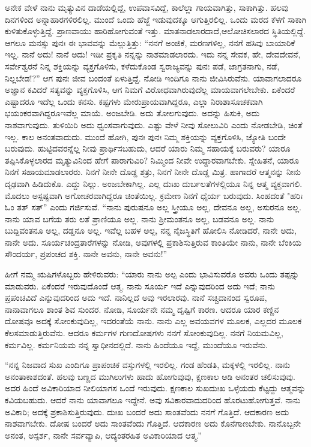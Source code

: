 ಅನೇಕ ವೇಳೆ ನಾನು ಮೃತ್ಯುವಿನ ದಾಡೆಯಲ್ಲಿದ್ದೆ, ಉಪವಾಸವಿದ್ದೆ, ಕಾಲೆಲ್ಲಾ ಗಾಯವಾಗಿತ್ತು, ಸಾಕಾಗಿತ್ತು. ಹಲವು ದಿನಗಳಿಂದ ಅನ್ನಾಹಾರಗಳಿರಲಿಲ್ಲ. ಮುಂದೆ ಒಂದು ಹೆಜ್ಜೆ ಇಡುವುದಕ್ಕೂ ಆಗುತ್ತಿರಲಿಲ್ಲ. ಒಂದು ಮರದ ಕೆಳಗೆ ಸಾಕಾಗಿ ಕುಳಿತುಕೊಳ್ಳುತ್ತಿದ್ದೆ. ಪ್ರಾಣವಾಯು ಹಾರಿಹೋಗುವಂತೆ ಇತ್ತು. ಮಾತನಾಡಲಾರದಾದೆ,\break ಆಲೋಚಿಸಲಾರದ ಸ್ಥಿತಿಯಲ್ಲಿದ್ದೆ. ಆಗಲೂ ಮನಸ್ಸು ಪುನಃ ಈ ಭಾವವನ್ನು ಮೆಲ್ಲುತ್ತಿತ್ತು: “ನನಗೆ ಅಂಜಿಕೆ, ಮರಣಗಳಿಲ್ಲ, ನನಗೆ ಹಸಿವು ಬಾಯಾರಿಕೆ ಇಲ್ಲ. ನಾನೆ ಅದು! ನಾನೆ ಅದು! ಇಡೀ ಪ್ರಕೃತಿ ನನ್ನನ್ನು ನಾಶಮಾಡಲಾರದು. ಇದು ನನ್ನ ಸೇವಕ, ಹೇ, ದೇವದೇವನೆ, ಸರ್ವೇಶ್ವರನೆ ನಿನ್ನ ಶಕ್ತಿಯನ್ನು ವ್ಯಕ್ತಗೊಳಿಸು, ಕಳೆದುಕೊಂಡ ಸ್ವರಾಜ್ಯವನ್ನು ಪುನಃ ಪಡೆ, ಜಾಗ್ರತನಾಗು, ನಡೆ, ನಿಲ್ಲಬೇಡ!?” ಆಗ ಪುನಃ ಜೀವ ಬಂದಂತೆ ಏಳುತ್ತಿದ್ದೆ. ನೋಡಿ ಇಂದಿಗೂ ನಾನು ಜೀವಿಸಿರುವೆನು. ಯಾವಾಗಲಾದರೂ ಅಜ್ಞಾನ ಕವಿದರೆ ಸತ್ಯವನ್ನು ವ್ಯಕ್ತಗೊಳಿಸಿ, ಆಗ ನಿಮಗೆ ವಿರೋಧವಾಗಿರುವುದೆಲ್ಲ ಮಾಯವಾಗಲೇಬೇಕು. ಏಕೆಂದರೆ ಎಷ್ಟಾದರೂ ಇದೆಲ್ಲ ಒಂದು ಕನಸು. ಕಷ್ಟಗಳು ಮೇರುಪ್ರಾಯವಾಗಿದ್ದರೂ, ಎಲ್ಲಾ ನಿರಾಶಾಸೂಚಕವಾಗಿ ಭಯಂಕರವಾಗಿದ್ದರೂ\break ಇವೆಲ್ಲ ಮಾಯೆ. ಅಂಜಬೇಡಿ. ಅದು ತೋಲಗುವುದು. ಅದನ್ನು ಹಿಸುಕಿ, ಅದು ನಾಶವಾಗುವುದು. ತುಳಿಯಿರಿ ಅದು ಧ್ವಂಸವಾಗುವುದು. ಎಷ್ಟು ವೇಳೆ ನೀವು ಸೋಲುವಿರಿ ಎಂದು ನೋಡಬೇಡಿ, ಚಿಂತೆ ಇಲ್ಲ. ಕಾಲ ಅನಂತವಾದುದು. ಮುಂದೆ ಹೋಗಿ, ಪುನಃ ಪುನಃ ನಿಮ್ಮ ಶಕ್ತಿಯನ್ನು ವ್ಯಕ್ತಗೊಳಿಸಿ, ಜ್ಯೋತಿ ಬಂದೇ ಬರುವುದು. ಹುಟ್ಟಿದವರನ್ನೆಲ್ಲ ನೀವು ಪ್ರಾರ್ಥಿಸಬಹುದು, ಆದರೆ ಯಾರು ನಿಮ್ಮ ಸಹಾಯಕ್ಕೆ ಬರುವರು? ಯಾರೂ ತಪ್ಪಿಸಿಕೊಳ್ಳಲಾರದ ಮೃತ್ಯುವಿನಿಂದ ಹೇಗೆ ಪಾರಾಗುವಿರಿ? ನಿಮ್ಮಿಂದ ನೀವೇ ಉದ್ದಾರವಾಗಬೇಕು. ಸ್ನೇಹಿತನೆ, ಯಾರೂ ನಿನಗೆ ಸಹಾಯಮಾಡಲಾರರು. ನಿನಗೆ ನೀನೇ ದೊಡ್ಡ ಶತ್ರು, ನಿನಗೆ ನೀನೇ ದೊಡ್ಡ ಮಿತ್ರ. ಹಾಗಾದರೆ ಆತ್ಮನನ್ನು ನೀನು ದೃಢವಾಗಿ ಹಿಡಿದುಕೊ. ಎದ್ದು ನಿಲ್ಲು. ಅಂಜಬೇಕಾಗಿಲ್ಲ. ಎಲ್ಲ ದುಃಖ ದುರ್ಬಲತೆಗಳಲ್ಲಿಯೂ ನಿನ್ನ ಆತ್ಮ ವ್ಯಕ್ತವಾಗಲಿ. ಮೊದಲು ಅಸ್ಪಷ್ಟವಾಗಿ ಅಗೋಚರವಾಗಿದ್ದರೂ ಚಿಂತೆಯಿಲ್ಲ. ಕ್ರಮೇಣ ನಿನಗೆ ಧೈರ್ಯ ಬರುವುದು. ಸಿಂಹದಂತೆ "ಹರಿಃ ಓಂ ತತ್ ಸತ್'' ಎಂದು ಗರ್ಜಿಸುವೆ. “ನಾನು ಪುರುಷನೂ ಅಲ್ಲ ಸ್ತ್ರೀಯೂ ಅಲ್ಲ, ದೇವನೂ ಅಲ್ಲ, ಅಸುರನೂ ಅಲ್ಲ. ನಾನು ಯಾವ ಬಗೆಯ ತರು ಲತೆ ಪ್ರಾಣಿಯೂ ಅಲ್ಲ. ನಾನು ಶ‍್ರೀಮಂತನೂ ಅಲ್ಲ, ಬಡವನೂ ಅಲ್ಲ. ನಾನು ಬುದ್ದಿವಂತನೂ ಅಲ್ಲ, ದಡ್ಡನೂ ಅಲ್ಲ. ಇವೆಲ್ಲ ಬಹಳ ಅಲ್ಪ, ನನ್ನ ನೈಜಸ್ಥಿತಿಗೆ ಹೋಲಿಸಿ ನೋಡಿದರೆ, ನಾನೇ ಅದು, ನಾನೇ ಅದು. ಸೂರ್ಯಚಂದ್ರತಾರೆಗಳನ್ನು ನೋಡಿ, ಅವುಗಳಲ್ಲಿ ಪ್ರಕಾಶಿಸುತ್ತಿರುವ ಕಾಂತಿಯೇ ನಾನು, ನಾನೇ ಬೆಂಕಿಯ ಸೌಂದರ್ಯ, ಪ್ರಪಂಚದ ಶಕ್ತಿ. ನಾನೇ ಅವನು, ನಾನೇ ಅವನು!”

ಹೀಗೆ ನಮ್ಮ ಋಷಿಗಳೊಬ್ಬರು ಹೇಳಿರುವರು: “ಯಾರು ನಾನು ಅಲ್ಪ ಎಂದು ಭಾವಿಸುವರೊ ಅವರು ಒಂದು ತಪ್ಪನ್ನು ಮಾಡುವರು. ಏಕೆಂದರೆ ಇರುವುದೊಂದೆ ಆತ್ಮ. ನಾನು ಸೂರ್ಯ ಇದೆ ಎನ್ನುವುದರಿಂದ ಅದು ಇದೆ; ನಾನು ಪ್ರಪಂಚವಿದೆ ಎನ್ನುವುದರಿಂದ ಅದು ಇದೆ. ನಾನಿಲ್ಲದೆ ಅವು ಇರಲಾರವು. ನಾನೆ ಸಚ್ಚಿದಾನಂದ ಸ್ವರೂಪ, ನಾನಾವಾಗಲೂ ಶಾಂತ ಶಿವ ಸುಂದರ. ನೋಡಿ, ಸೂರ್ಯನೇ ನಮ್ಮ ದೃಷ್ಟಿಗೆ ಕಾರಣ. ಆದರೂ ಯಾರ ಕಣ್ಣಿನ ದೋಷವೂ ಅದಕ್ಕೆ ಸೋಂಕುವುದಿಲ್ಲ, ಇದರಂತೆಯೆ ನಾನು. ನಾನು ಎಲ್ಲ ಅವಯವಗಳ ಮೂಲಕ, ಎಲ್ಲದರ ಮೂಲಕ ಕೆಲಸಮಾಡುತ್ತಿರುವೆನು. ಆದರೂ ಕರ್ಮಗಳ ಗುಣದೋಷಗಳು ನನಗೆ ಸೋಂಕುವುದಿಲ್ಲ. ನನಗೆ ನಿಯಮವಿಲ್ಲ, ಕರ್ಮವಿಲ್ಲ. ಕರ್ಮನಿಯಮ ನನ್ನ ಸ್ವಾಧೀನದಲ್ಲಿದೆ. ನಾನು ಹಿಂದೆಯೂ ಇದ್ದೆ, ಮುಂದೆಯೂ ಇರುವೆನು.

“ನನ್ನ ನಿಜವಾದ ಸುಖ ಎಂದಿಗೂ ಪ್ರಾಪಂಚಿಕ ವಸ್ತುಗಳಲ್ಲಿ ಇರಲಿಲ್ಲ. ಗಂಡ ಹೆಂಡತಿ, ಮಕ್ಕಳಲ್ಲಿ ಇರಲಿಲ್ಲ. ನಾನು ಅನಂತಾಕಾಶದಂತೆ. ಹಲವು ಬಣ್ಣದ ಮುಗಿಲುಗಳು ಹಾದು ಹೋಗುವುವು, ಕ್ಷಣಕಾಲ ಆಡಿ ಅನಂತರ ಚಲಿಸುವುವು. ಅದರ ಹಿಂದೆ ಅವಿಕಾರಿಯಾದ ನೀಲಿಯಾಗಸ ಒಂದೆ ಇರುವುದು. ಕ್ಷಣಕಾಲ ಸುಖದುಃಖ ಒಳ್ಳೆಯದು ಕೆಟ್ಟದ್ದು ಆತ್ಮವನ್ನು ಕವಿಯಬಹುದು. ಆದರೆ ನಾನು ಯಾವಾಗಲೂ ಇದ್ದೇನೆ. ಅವು ಸವಿಕಾರವಾದುದರಿಂದ ಹೊರಟುಹೋಗುತ್ತವೆ. ನಾನು ಅವಿಕಾರಿ; ಅದಕ್ಕೆ ಪ್ರಕಾಶಿಸುತ್ತಿರುವುದು. ದುಃಖ ಬಂದರೆ ಅದು ಸಾಂತವೆಂದು ನನಗೆ ಗೊತ್ತಿದೆ. ಆದಕಾರಣ ಅದು ನಾಶವಾಗಬೇಕು. ದೋಷ ಬಂದರೆ ಅದು ಸಾಂತವೆಂದು ಗೊತ್ತಿದೆ. ಆದಕಾರಣ ಅದು ಕೊನೆಗಾಣಬೇಕು. ನಾನೊಬ್ಬನೇ ಅನಂತ, ಅಸ್ಪರ್ಶ, ನಾನೇ ಸರ್ವವ್ಯಾಪಿ, ಆದ್ಯಂತರಹಿತ ಅವಿಕಾರಿಯಾದ ಆತ್ಮ.''

